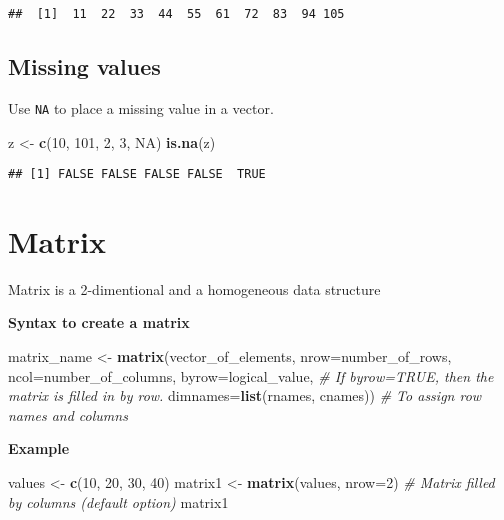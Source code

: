 \documentclass[]{book}
\newenvironment{Shaded}{\begin{snugshade}}{\end{snugshade}}
\newcommand{\CommentTok}[1]{\textcolor[rgb]{0.56,0.35,0.01}{\textit{#1}}}
\newcommand{\DataTypeTok}[1]{\textcolor[rgb]{0.13,0.29,0.53}{#1}}
\newcommand{\DecValTok}[1]{\textcolor[rgb]{0.00,0.00,0.81}{#1}}
\newcommand{\KeywordTok}[1]{\textcolor[rgb]{0.13,0.29,0.53}{\textbf{#1}}}
\newcommand{\NormalTok}[1]{#1}
\newcommand{\OtherTok}[1]{\textcolor[rgb]{0.56,0.35,0.01}{#1}}
\newcommand{\StringTok}[1]{\textcolor[rgb]{0.31,0.60,0.02}{#1}}
\begin{document}
\begin{verbatim}
##  [1]  11  22  33  44  55  61  72  83  94 105
\end{verbatim}

\hypertarget{missing-values}{%
\subsection{Missing values}\label{missing-values}}

Use \texttt{NA} to place a missing value in a vector.

\begin{Shaded}
\begin{Highlighting}[]
\NormalTok{z <-}\StringTok{ }\KeywordTok{c}\NormalTok{(}\DecValTok{10}\NormalTok{, }\DecValTok{101}\NormalTok{, }\DecValTok{2}\NormalTok{, }\DecValTok{3}\NormalTok{, }\OtherTok{NA}\NormalTok{)}
\KeywordTok{is.na}\NormalTok{(z)}
\end{Highlighting}
\end{Shaded}

\begin{verbatim}
## [1] FALSE FALSE FALSE FALSE  TRUE
\end{verbatim}

\hypertarget{matrix}{%
\section{Matrix}\label{matrix}}

Matrix is a 2-dimentional and a homogeneous data structure

\textbf{Syntax to create a matrix}

\begin{Shaded}
\begin{Highlighting}[]
\NormalTok{matrix_name <-}\StringTok{ }\KeywordTok{matrix}\NormalTok{(vector_of_elements, }
                      \DataTypeTok{nrow=}\NormalTok{number_of_rows,}
                      \DataTypeTok{ncol=}\NormalTok{number_of_columns,}
                      \DataTypeTok{byrow=}\NormalTok{logical_value, }\CommentTok{# If byrow=TRUE, then the matrix is filled in by row.}
                      \DataTypeTok{dimnames=}\KeywordTok{list}\NormalTok{(rnames, cnames)) }\CommentTok{# To assign row names and columns}
\end{Highlighting}
\end{Shaded}

\textbf{Example}

\begin{Shaded}
\begin{Highlighting}[]
\NormalTok{values <-}\StringTok{ }\KeywordTok{c}\NormalTok{(}\DecValTok{10}\NormalTok{, }\DecValTok{20}\NormalTok{, }\DecValTok{30}\NormalTok{, }\DecValTok{40}\NormalTok{)}
\NormalTok{matrix1 <-}\StringTok{ }\KeywordTok{matrix}\NormalTok{(values, }\DataTypeTok{nrow=}\DecValTok{2}\NormalTok{) }\CommentTok{# Matrix filled by columns (default option)}
\NormalTok{matrix1}
\end{Highlighting}
\end{Shaded}
\end{document}
